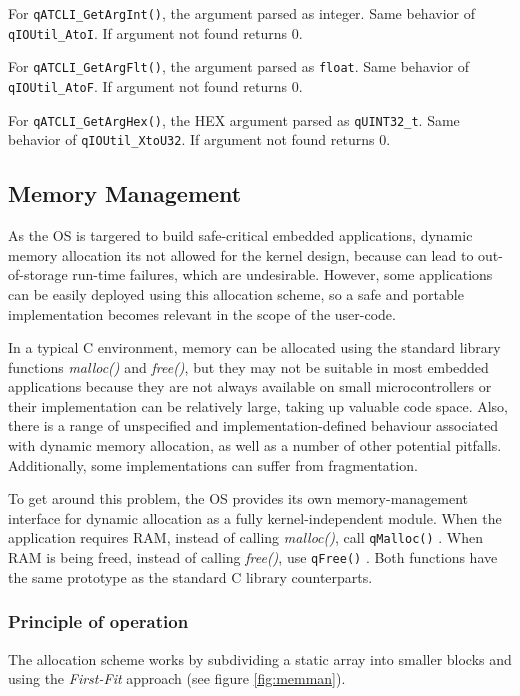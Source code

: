 For \lstinline{qATCLI_GetArgInt()}, the argument parsed as integer. Same behavior of \lstinline{qIOUtil_AtoI}. If argument not found returns 0.

For \lstinline{qATCLI_GetArgFlt()}, the argument parsed as \lstinline{float}. Same behavior of \lstinline{qIOUtil_AtoF}. If argument not found returns 0.

For \lstinline{qATCLI_GetArgHex()}, the HEX argument parsed as \lstinline{qUINT32_t}. Same behavior of \lstinline{qIOUtil_XtoU32}. If argument not found returns 0.

\subsection{Memory Management} \label{memmanagement}
As the OS is targered to build safe-critical embedded applications, dynamic memory allocation its not allowed for the kernel design, because can lead to out-of-storage run-time failures, which are undesirable. However, some applications can be easily deployed using this allocation scheme, so a safe and portable implementation becomes relevant in the scope of the user-code. 

In a typical C environment, memory can be allocated using the standard library functions  \textit{malloc()} and \textit{free()}, but they may not be suitable in most embedded applications because they are not always available on small microcontrollers or their implementation can be relatively large, taking up valuable code space. Also, there is a range of unspecified and implementation-defined behaviour associated with dynamic memory allocation, as well as a number of other potential pitfalls. Additionally, some implementations can suffer from fragmentation.

To get around this problem, the OS provides its own memory-management interface for dynamic allocation as a fully kernel-independent module. When the application requires RAM, instead of calling \textit{malloc()},  call \lstinline{qMalloc()} . When RAM is being freed, instead of calling \textit{free()}, use \lstinline{qFree()} . Both functions have the same prototype as the standard C library counterparts.

\subsubsection{Principle of operation}
The allocation scheme works by subdividing a static array into smaller blocks and using the \textit{First-Fit} approach (see figure \ref{fig:memman}). 

